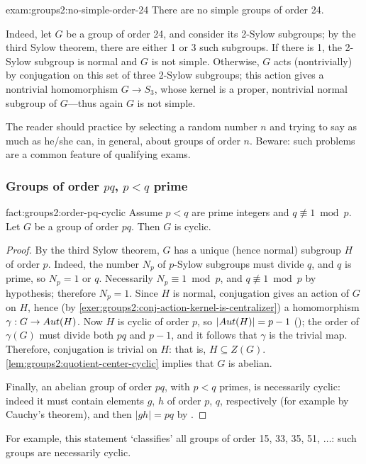 \begin{exam}{}{exam:groups2:no-simple-order-24}
  There are no simple groups of order 24.

  Indeed, let $G$ be a group of order 24, and consider its 2-Sylow
  subgroups; by the third Sylow theorem, there are either 1 or 3 such
  subgroups. If there is 1, the 2-Sylow subgroup is normal and $G$ is
  not simple. Otherwise, $G$ acts (nontrivially) by conjugation on
  this set of three 2-Sylow subgroups; this action gives a nontrivial
  homomorphism $G \to S_3$, whose kernel is a proper, nontrivial
  normal subgroup of $G$---thus again $G$ is not simple.
\end{exam}
The reader should practice by selecting a random number $n$ and trying
to say as much as he/she can, in general, about groups of order
$n$. Beware: such problems are a common feature of qualifying exams.

\subsubsection*{Groups of order $pq$, $p < q$ prime}

\begin{fact}{}{fact:groups2:order-pq-cyclic}
  Assume $p < q$ are prime integers and $q \not\equiv 1 \bmod p$. Let
  $G$ be a group of order $pq$. Then $G$ is cyclic.
\end{fact}
\begin{proof}
  By the third Sylow theorem, $G$ has a unique (hence normal) subgroup
  $H$ of order $p$. Indeed, the number $N_p$ of $p$-Sylow subgroups
  must divide $q$, and $q$ is prime, so $N_p = 1$ or $q$. Necessarily
  $N_p \equiv 1 \bmod p$, and $q \not\equiv 1 \bmod p$ by hypothesis;
  therefore $N_p = 1$.  Since $H$ is normal, conjugation gives an
  action of $G$ on $H$, hence (by
  \cref{exer:groups2:conj-action-kernel-is-centralizer}) a
  homomorphism $\gamma : G \to Aut(H)$.  Now $H$ is cyclic of order
  $p$, so $|Aut(H)| = p - 1$ ();
  the order of $\gamma(G)$ must divide both $pq$ and $p - 1$, and it
  follows that $\gamma$ is the trivial map.  Therefore, conjugation is
  trivial on $H$: that is, $H \subseteq Z(G)$.
  \cref{lem:groups2:quotient-center-cyclic} implies that $G$ is
  abelian.

  Finally, an abelian group of order $pq$, with $p < q$ primes, is
  necessarily cyclic: indeed it must contain elements $g$, $h$ of
  order $p$, $q$, respectively (for example by Cauchy's theorem), and
  then $|gh| = pq$ by .
\end{proof}
For example, this statement `classifies' all groups of order 15, 33,
35, 51, $\dots$: such groups are necessarily cyclic.

